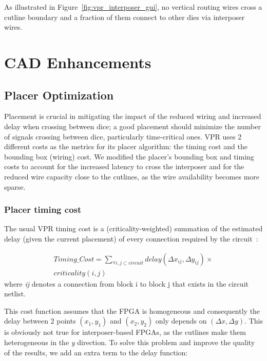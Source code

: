 \documentclass{sig-alternate-2013}
\begin{document}
As illustrated in Figure~\ref{fig:vpr_interposer_gui}, no vertical routing wires cross a cutline boundary and a fraction of them connect to other dies via interposer wires.



\section{CAD Enhancements}
\label{cadSection}

\subsection{Placer Optimization}
\label{cad_enh_placer_subsection}
Placement is crucial in mitigating the impact of the reduced wiring and increased delay when crossing between dice; a good placement should minimize the number of signals crossing between dice, particularly time-critical ones. VPR uses 2 different costs as the metrics for its placer algorithm: the timing cost and the bounding box (wiring) cost. We modified the placer's bounding box and timing costs to account for the increased latency to cross the interposer and for the reduced wire capacity close to the cutlines, as the wire availability becomes more sparse.

\subsubsection{Placer timing cost}
The usual VPR timing cost is a (criticality-weighted) summation of the estimated delay (given the current placement) of every connection required by the circuit~\cite{timing2000}:

\begin{equation} \label{eq:timing_eq_full}
\begin{split}
Timing\_Cost = \sum_{\forall i, j \subset circuit} delay(\Delta x_{ij},\Delta y_{ij}) \times \\ 
criticality(i,j)
\end{split}
\end{equation}
where \textit{ij} denotes a connection from block i to block j that exists in the circuit netlist.

This cost function assumes that the FPGA is homogeneous and consequently the delay between 2 points $(x_1,y_1)$ and $(x_2,y_2)$ only depends on $(\Delta x,\Delta y)$. This is obviously not true for interposer-based FPGAs, as the cutlines make them heterogeneous in the \textit{y} direction. To solve this problem and improve the quality of the results, we add an extra term to the delay function:
\end{document}
